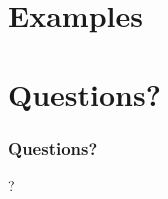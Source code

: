 \documentclass[xcolor=dvipsnames]{beamer}
\begin{document}
\section{Examples}



\section{Questions?}

\begin{frame}
\frametitle{Questions?}
\begin{center}
\Huge{?}
\end{center}
\end{frame}
\end{document}
